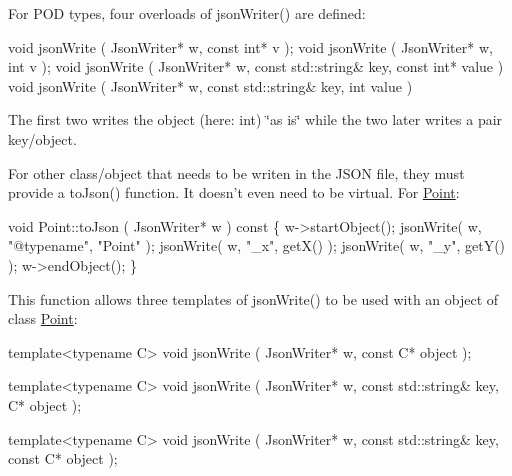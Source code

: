 For P\-O\-D types, four overloads of {\ttfamily json\-Writer()} are defined\-:


\begin{DoxyCode}
\textcolor{keywordtype}{void}  jsonWrite ( JsonWriter* w, \textcolor{keyword}{const} \textcolor{keywordtype}{int}* v );
\textcolor{keywordtype}{void}  jsonWrite ( JsonWriter* w,       \textcolor{keywordtype}{int}  v );
\textcolor{keywordtype}{void}  jsonWrite ( JsonWriter* w, \textcolor{keyword}{const} std::string& key, \textcolor{keyword}{const} \textcolor{keywordtype}{int}* value )
\textcolor{keywordtype}{void}  jsonWrite ( JsonWriter* w, \textcolor{keyword}{const} std::string& key,       \textcolor{keywordtype}{int}  value )
\end{DoxyCode}


The first two writes the object (here\-: {\ttfamily int}) \char`\"{}as is\char`\"{} while the two later writes a pair key/object.

For other class/object that needs to be writen in the J\-S\-O\-N file, they must provide a {\ttfamily to\-Json()} function. It doesn't even need to be virtual. For \hyperlink{classHurricane_1_1Point}{Point}\-:


\begin{DoxyCode}
\textcolor{keywordtype}{void}  Point::toJson ( JsonWriter* w )\textcolor{keyword}{ const}
\textcolor{keyword}{}\{
  w->startObject();
  jsonWrite( w, \textcolor{stringliteral}{"@typename"}, \textcolor{stringliteral}{"Point"} );
  jsonWrite( w, \textcolor{stringliteral}{"\_x"}, getX() );
  jsonWrite( w, \textcolor{stringliteral}{"\_y"}, getY() );
  w->endObject();
\}
\end{DoxyCode}


This function allows three templates of {\ttfamily json\-Write()} to be used with an object of class \hyperlink{classHurricane_1_1Point}{Point}\-:


\begin{DoxyCode}
\textcolor{keyword}{template}<\textcolor{keyword}{typename} C>
\textcolor{keywordtype}{void}  jsonWrite ( JsonWriter* w, \textcolor{keyword}{const} C* \textcolor{keywordtype}{object} );

\textcolor{keyword}{template}<\textcolor{keyword}{typename} C>
\textcolor{keywordtype}{void}  jsonWrite ( JsonWriter* w, \textcolor{keyword}{const} std::string& key, C* \textcolor{keywordtype}{object} );

\textcolor{keyword}{template}<\textcolor{keyword}{typename} C>
\textcolor{keywordtype}{void}  jsonWrite ( JsonWriter* w, \textcolor{keyword}{const} std::string& key, \textcolor{keyword}{const} C* \textcolor{keywordtype}{object} );
\end{DoxyCode}


